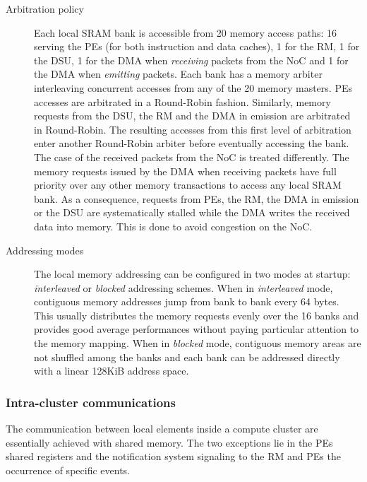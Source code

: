 \documentclass[main.tex]{subfiles}
\begin{document}
\begin{description}
    \item[Arbitration policy]
        Each local SRAM bank is accessible from 20 memory access paths: 16
        serving the PEs (for both instruction and data caches), 1 for the RM, 1
        for the DSU, 1 for the DMA when \emph{receiving} packets from the NoC
        and 1 for the DMA when \emph{emitting} packets. Each bank has a memory
        arbiter interleaving concurrent accesses from any of the 20 memory
        masters. PEs accesses are arbitrated in a Round-Robin fashion.
        Similarly, memory requests from the DSU, the RM and the DMA in emission
        are arbitrated in Round-Robin. The resulting accesses from this first
        level of arbitration enter another Round-Robin arbiter before
        eventually accessing the bank. The case of the received packets from
        the NoC is treated differently. The memory requests issued by the DMA
        when receiving packets have full priority over any other memory
        transactions to access any local SRAM bank. As a consequence, requests
        from PEs, the RM, the DMA in emission or the DSU are systematically
        stalled while the DMA writes the received data into memory. This is
        done to avoid congestion on the NoC.

    \item[Addressing modes]
        The local memory addressing can be configured in two modes at startup:
        \emph{interleaved} or \emph{blocked} addressing schemes. When in
        \emph{interleaved} mode, contiguous memory addresses jump from bank to
        bank every 64 bytes. This usually distributes the memory requests
        evenly over the 16 banks and provides good average performances without
        paying particular attention to the memory mapping. When in
        \emph{blocked} mode, contiguous memory areas are not shuffled among the
        banks and each bank can be addressed directly with a linear 128KiB
        address space.
\end{description}


\subsubsection{Intra-cluster communications}
\label{sssec_execModel_intraClusterComs}
The communication between local elements inside a compute cluster are
essentially achieved with shared memory. The two exceptions lie in the PEs
shared registers and the notification system signaling to the RM and PEs the
occurrence of specific events.
\end{document}
